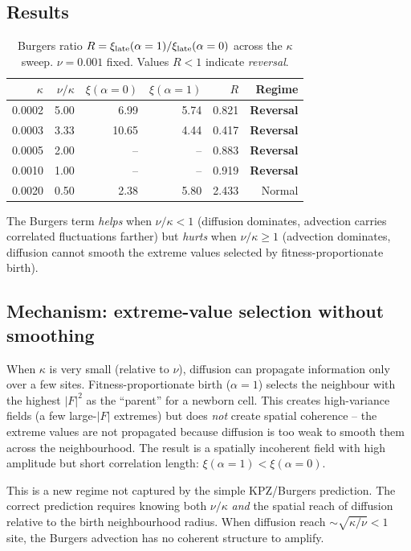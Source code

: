 \documentclass[11pt,a4paper]{article}
\begin{document}
\subsection{Results}

\begin{table}[h]
\centering
\caption{Burgers ratio $R = \xi_{\rm late}(\alpha=1)/\xi_{\rm late}(\alpha=0)$
         across the $\kappa$ sweep.
         $\nu = 0.001$ fixed.  Values $R < 1$ indicate \emph{reversal}.}
\label{tab:burgers}
\begin{tabular}{rrrrrr}
\toprule
$\kappa$ & $\nu/\kappa$ & $\xi(\alpha=0)$ & $\xi(\alpha=1)$ & $R$ & Regime \\
\midrule
0.0002 & 5.00 & 6.99 & 5.74 & 0.821 & \textbf{Reversal} \\
0.0003 & 3.33 & 10.65 & 4.44 & 0.417 & \textbf{Reversal} \\
0.0005 & 2.00 &  -- &  -- & 0.883 & \textbf{Reversal} \\
0.0010 & 1.00 &  -- &  -- & 0.919 & \textbf{Reversal} \\
0.0020 & 0.50 & 2.38 & 5.80 & 2.433 & Normal \\
\bottomrule
\end{tabular}
\end{table}

The Burgers term \emph{helps} when $\nu/\kappa < 1$ (diffusion dominates,
advection carries correlated fluctuations farther) but \emph{hurts} when
$\nu/\kappa \geq 1$ (advection dominates, diffusion cannot smooth the extreme
values selected by fitness-proportionate birth).

\subsection{Mechanism: extreme-value selection without smoothing}

When $\kappa$ is very small (relative to $\nu$), diffusion can propagate
information only over a few sites.  Fitness-proportionate birth
($\alpha = 1$) selects the neighbour with the highest $|F|^2$ as the
``parent'' for a newborn cell.  This creates high-variance fields (a few
large-$|F|$ extremes) but does \emph{not} create spatial coherence -- the
extreme values are not propagated because diffusion is too weak to smooth them
across the neighbourhood.  The result is a spatially incoherent field with
high amplitude but short correlation length: $\xi(\alpha=1) < \xi(\alpha=0)$.

This is a new regime not captured by the simple KPZ/Burgers prediction.
The correct prediction requires knowing both $\nu/\kappa$ \emph{and} the
spatial reach of diffusion relative to the birth neighbourhood radius.
When diffusion reach $\sim \sqrt{\kappa/\nu} < 1$ site, the Burgers advection
has no coherent structure to amplify.
\end{document}
